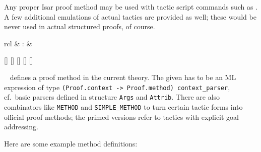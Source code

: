\begin{isabellebody}
\begin{isamarkuptext}
  Any proper Isar proof method may be used with tactic script commands
  such as \hyperlink{command.apply}{\mbox{}}.  A few additional emulations of actual
  tactics are provided as well; these would be never used in actual
  structured proofs, of course.%
\end{isamarkuptext}%
\isamarkuptrue%
%
\isamarkuptrue%
%
\begin{isamarkuptext}%
\begin{matharray}{rcl}
    \hypertarget{command.method-setup}{\hyperlink{command.method-setup}{\mbox{}}} & : &  \\
  \end{matharray}

  \begin{railoutput}
[]
[]
[]
[]
[]
\rail@end
\end{railoutput}


  \begin{description}

  \item \hyperlink{command.method-setup}{\mbox{}}~
  defines a proof method in the current theory.  The given  has to be an ML expression of type
  \verb|(Proof.context -> Proof.method) context_parser|, cf.\
  basic parsers defined in structure \verb|Args| and \verb|Attrib|.  There are also combinators like \verb|METHOD| and \verb|SIMPLE_METHOD| to turn certain tactic forms into official proof
  methods; the primed versions refer to tactics with explicit goal
  addressing.

  Here are some example method definitions:


\end{description}
\end{isamarkuptext}
\end{isabellebody}
